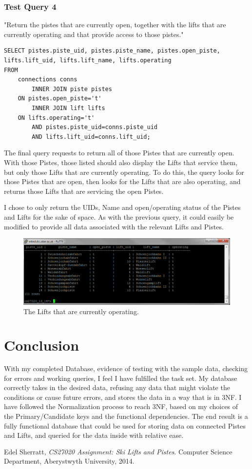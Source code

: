 \documentclass[11pt]{scrartcl} %
\begin{document}
\newpage

\subsubsection{Test Query 4}
"Return the pistes that are currently open, together with the lifts that are currently operating and that provide access to those pistes."
\begin{lstlisting}
SELECT pistes.piste_uid, pistes.piste_name, pistes.open_piste, 
lifts.lift_uid, lifts.lift_name, lifts.operating
FROM
	connections conns
		INNER JOIN piste pistes
	ON pistes.open_piste='t' 
		INNER JOIN lift lifts
	ON lifts.operating='t'
		AND pistes.piste_uid=conns.piste_uid
		AND lifts.lift_uid=conns.lift_uid;
\end{lstlisting}

The final query requests to return all of those Pistes that are currently open. With those Pistes, those listed should also display the Lifts that service them, but only those Lifts that are currently operating. To do this, the query looks for those Pistes that are open, then looks for the Lifts that are also operating, and returns those Lifts that are servicing the open Pistes.

I chose to only return the UIDs, Name and open/operating status of the Pistes and Lifts for the sake of space. As with the previous query, it could easily be modified to provide all data associated with the relevant Lifts and Pistes.

\begin{figure}[H]
  \centering
    \includegraphics[width=1\textwidth]{IMG/query_4_1.png}
 \caption{The Lifts that are currently operating.}
\end{figure}

\section{Conclusion}
With my completed Database, evidence of testing with the sample data, checking for errors and working queries, I feel I have fulfilled the task set. My database correctly takes in the desired data, refusing any data that might violate the conditions or cause future errors, and stores the data in a way that is in 3NF. I have followed the Normalization process to reach 3NF, based on my choices of the Primary/Candidate keys and the functional dependencies. The end result is a fully functional database that could be used for storing data on connected Pistes and Lifts, and queried for the data inside with relative ease.

\newpage
\begin{thebibliography}{9}

  Edel Sherratt,
  \emph{CS27020 Assignment: Ski Lifts and Pistes}.
  Computer Science Department,
  Aberystwyth University,
  2014.

\end{thebibliography}
\end{document}

